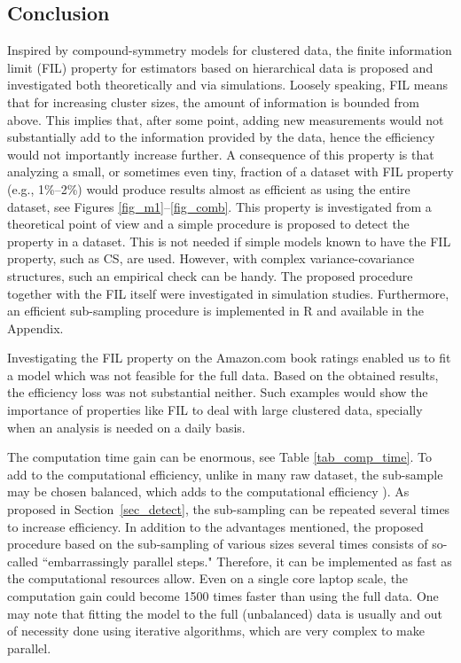 \documentclass[11pt,a5paper,twoside]{book}
\begin{document}
\subsection{Conclusion}
\label{cssec_conclusions}
Inspired by compound-symmetry models for clustered data, the finite information limit (FIL) property for estimators based on hierarchical data  is proposed and investigated both theoretically and via simulations. Loosely speaking, FIL means that for increasing cluster sizes, the amount of information is bounded from above. This implies that, after some point, adding new measurements would not substantially add to the information provided by the data, hence the efficiency would not importantly increase further. A consequence of this property is that analyzing a small, or sometimes even tiny, fraction of a dataset with FIL property (e.g., 1\%--2\%) would produce results  almost as efficient as using the entire dataset, see Figures \ref{fig_m1}--\ref{fig_comb}. This property is investigated from a theoretical point of view and a simple procedure is proposed to detect the property in a dataset. This is not needed if simple models known to have the FIL property, such as CS, are used. However, with complex variance-covariance structures, such an empirical check can be handy. 
The proposed procedure together with the FIL itself were investigated in simulation studies. Furthermore, an efficient sub-sampling procedure is implemented in \textsf{R} and available in the Appendix.

Investigating the FIL property on the Amazon.com book ratings enabled us to fit a model which was not feasible for the full data. Based on the obtained results, the efficiency loss was not substantial neither. Such examples would show the importance of properties like FIL to deal with large clustered data, specially when an analysis is needed on a daily basis.

The computation time gain can be enormous, see Table \ref{tab_comp_time}. To add to the computational  efficiency, unlike in many raw dataset, the sub-sample may be chosen balanced,  which adds to the computational efficiency \cite{Lisa2016_1}). As proposed in Section~\ref{sec_detect}, the sub-sampling can be repeated several times to increase efficiency. In addition to the  advantages mentioned, the proposed procedure based on the sub-sampling of various sizes several times consists of so-called ``embarrassingly parallel steps." Therefore, it can be implemented as fast as the computational resources allow. Even on a single core laptop scale, the computation gain could become 1500 times faster than using the full data. One may note that fitting the model to the full (unbalanced) data is usually and out of necessity done using iterative algorithms, which are very complex to make parallel.
\end{document}
